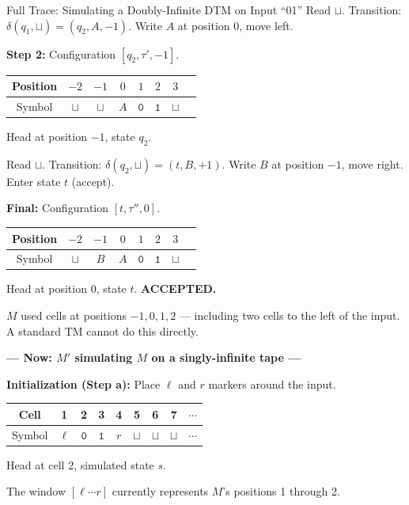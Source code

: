 \begin{examplebox}{{Full Trace: Simulating a Doubly-Infinite DTM on Input ``01''}}
Read $\sqcup$. Transition: $\delta(q_1, \sqcup) = (q_2, A, -1)$.
Write $A$ at position 0, move left.

\textbf{Step 2:} Configuration $[q_2, \tau', -1]$.

\begin{center}
\begin{tabular}{c|ccccccc}
Position & $-2$ & $-1$ & $0$ & $1$ & $2$ & $3$ \\
\hline
Symbol & $\sqcup$ & $\sqcup$ & $A$ & $\mathtt{0}$ & $\mathtt{1}$ & $\sqcup$ \\
\end{tabular}
\quad Head at position $-1$, state $q_2$.
\end{center}

Read $\sqcup$. Transition: $\delta(q_2, \sqcup) = (t, B, +1)$.
Write $B$ at position $-1$, move right. Enter state $t$ (accept).

\textbf{Final:} Configuration $[t, \tau'', 0]$.

\begin{center}
\begin{tabular}{c|ccccccc}
Position & $-2$ & $-1$ & $0$ & $1$ & $2$ & $3$ \\
\hline
Symbol & $\sqcup$ & $B$ & $A$ & $\mathtt{0}$ & $\mathtt{1}$ & $\sqcup$ \\
\end{tabular}
\quad Head at position 0, state $t$. \textbf{ACCEPTED.}
\end{center}

$M$ used cells at positions $-1, 0, 1, 2$ --- including two cells to the left
of the input. A standard TM cannot do this directly.

\bigskip
\textbf{--- Now: $M'$ simulating $M$ on a singly-infinite tape ---}

\textbf{Initialization (Step a):} Place $\ell$ and $r$ markers around the input.

\begin{center}
\begin{tabular}{c|cccccccc}
Cell & 1 & 2 & 3 & 4 & 5 & 6 & 7 & $\cdots$ \\
\hline
Symbol & $\ell$ & $\mathtt{0}$ & $\mathtt{1}$ & $r$ & $\sqcup$ & $\sqcup$ & $\sqcup$ & $\cdots$ \\
\end{tabular}
\quad Head at cell 2, simulated state $s$.
\end{center}

The window $[\ell \cdots r]$ currently represents $M$'s positions 1 through 2.


\end{examplebox}
